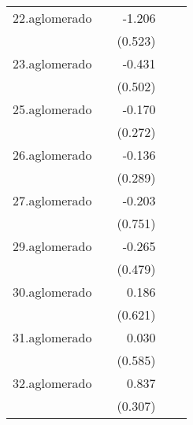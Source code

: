 {\begin{longtable}{l*{4}{D{.}{.}{-1}}}
\addlinespace
22.aglomerado&                     &      -1.206\sym{*}  &                     &                     \\
            &                     &     (0.523)         &                     &                     \\
\addlinespace
23.aglomerado&                     &      -0.431         &                     &                     \\
            &                     &     (0.502)         &                     &                     \\
\addlinespace
25.aglomerado&                     &      -0.170         &                     &                     \\
            &                     &     (0.272)         &                     &                     \\
\addlinespace
26.aglomerado&                     &      -0.136         &                     &                     \\
            &                     &     (0.289)         &                     &                     \\
\addlinespace
27.aglomerado&                     &      -0.203         &                     &                     \\
            &                     &     (0.751)         &                     &                     \\
\addlinespace
29.aglomerado&                     &      -0.265         &                     &                     \\
            &                     &     (0.479)         &                     &                     \\
\addlinespace
30.aglomerado&                     &       0.186         &                     &                     \\
            &                     &     (0.621)         &                     &                     \\
\addlinespace
31.aglomerado&                     &       0.030         &                     &                     \\
            &                     &     (0.585)         &                     &                     \\
\addlinespace
32.aglomerado&                     &       0.837\sym{**} &                     &                     \\
            &                     &     (0.307)         &                     &                     \\

\end{longtable}}
